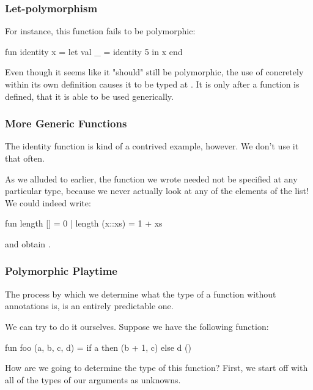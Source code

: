 \documentclass[aspectratio=169, handout]{beamer}
\begin{document}
\begin{frame}[fragile]
  \frametitle{Let-polymorphism}

  For instance, this function fails to be polymorphic: 
  \pause
  \begin{codeblock}
    fun identity x =
      let 
        val _ = identity 5
      in
        x
      end
  \end{codeblock}

  \pause
  \vspace{\fill}

  Even though it seems like it "should" still be polymorphic, the use of 
  concretely within its own definition causes it to be typed at . It
  is only after a function is defined, that it is able to be used generically. 
\end{frame}

\begin{frame}[fragile]
  \frametitle{More Generic Functions}

  The identity function is kind of a contrived example, however. We don't use it that
  often.\footnotemark

  \pause
  \vspace{\fill}

  As we alluded to earlier, the  function we wrote needed not be specified
  at any particular type, because we never actually look at any of the elements of
  the list! We could indeed write: 

  \pause
  \vspace{\fill}

  \begin{codeblock}
    fun length [] = 0
      | length (x::xs) = 1 + xs
  \end{codeblock}

  and obtain .

\end{frame}

\begin{frame}[fragile]
  \frametitle{Polymorphic Playtime}

  The process by which we determine what the type of a function without
  annotations is, is an entirely predictable one.

  \pause
  \vspace{\fill}

  We can try to do it ourselves. Suppose we have the following function:
  
  \pause
  \begin{codeblock}
    fun foo (a, b, c, d) = 
      if a then 
        (b + 1, c)
      else
        d () 
  \end{codeblock}

  \pause
  \vspace{\fill}

  How are we going to determine the type of this function? First, we 
  start off with all of the types of our arguments as unknowns.
\end{frame}
\end{document}
